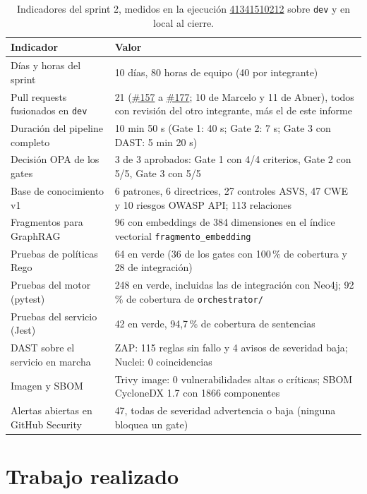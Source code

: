 \documentclass[11pt,a4paper]{report}
\newcommand{\pr}[1]{\href{https://github.com/PracticasESPE/Framework_Desarrollo_Seguro/pull/#1}{\##1}}
\newcommand{\run}[1]{\href{https://github.com/PracticasESPE/Framework_Desarrollo_Seguro/actions/runs/#1}{#1}}
\begin{document}
\begin{table}[H]
\centering
\caption{Indicadores del sprint 2, medidos en la ejecución \run{41341510212} sobre \texttt{dev} y en local al cierre.}
\begin{tabularx}{\textwidth}{@{}P{6.2cm}L@{}}
\toprule
\textbf{Indicador} & \textbf{Valor}\\
\midrule
Días y horas del sprint & 10 días, 80 horas de equipo (40 por integrante)\\
Pull requests fusionados en \texttt{dev} & 21 (\pr{157} a \pr{177}; 10 de Marcelo y 11 de Abner), todos con revisión del otro integrante, más el de este informe\\
Duración del pipeline completo & 10 min 50 s (Gate 1: 40 s; Gate 2: 7 s; Gate 3 con DAST: 5 min 20 s)\\
Decisión OPA de los gates & 3 de 3 aprobados: Gate 1 con 4/4 criterios, Gate 2 con 5/5, Gate 3 con 5/5\\
Base de conocimiento v1 & 6 patrones, 6 directrices, 27 controles ASVS, 47 CWE y 10 riesgos OWASP API; 113 relaciones\\
Fragmentos para GraphRAG & 96 con embeddings de 384 dimensiones en el índice vectorial \texttt{fragmento\_embedding}\\
Pruebas de políticas Rego & 64 en verde (36 de los gates con 100\,\% de cobertura y 28 de integración)\\
Pruebas del motor (pytest) & 248 en verde, incluidas las de integración con Neo4j; 92\,\% de cobertura de \texttt{orchestrator/}\\
Pruebas del servicio (Jest) & 42 en verde, 94,7\,\% de cobertura de sentencias\\
DAST sobre el servicio en marcha & ZAP: 115 reglas sin fallo y 4 avisos de severidad baja; Nuclei: 0 coincidencias\\
Imagen y SBOM & Trivy image: 0 vulnerabilidades altas o críticas; SBOM CycloneDX 1.7 con 1866 componentes\\
Alertas abiertas en GitHub Security & 47, todas de severidad advertencia o baja (ninguna bloquea un gate)\\
\bottomrule
\end{tabularx}
\end{table}

\chapter{Trabajo realizado}
\end{document}
